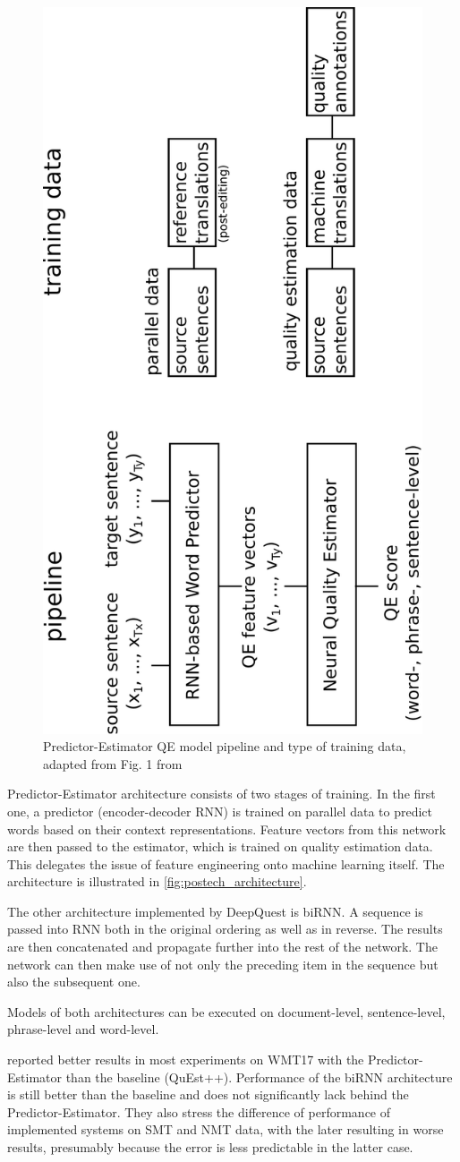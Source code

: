 \begin{figure}[H]
  \centering
  \includegraphics[height=0.9\textwidth, angle=-90]{img/quality_estimation/postech_architecture_pdfa1a.pdf}
  \caption{\label{fig:postech_architecture} Predictor-Estimator QE model pipeline and type of training data, adapted from Fig. 1 from \citep{Kim-Postech:2017}}
\end{figure}

Predictor-Estimator architecture \citep{Kim-Postech:2017} consists of two stages of training. In the first one, a predictor (encoder-decoder RNN) is trained on parallel data to predict words based on their context representations. Feature vectors from this network are then passed to the estimator, which is trained on quality estimation data. This delegates the issue of feature engineering onto machine learning itself. The architecture is illustrated in \autoref{fig:postech_architecture}.

The other architecture implemented by DeepQuest is biRNN. A sequence is passed into RNN both in the original ordering as well as in reverse. The results are then concatenated and propagate further into the rest of the network. The network can then make use of not only the preceding item in the sequence but also the subsequent one.

Models of both architectures can be executed on document-level, sentence-level, phrase-level and word-level.

\cite{deepquest} reported better results in most experiments on WMT17 with the Predictor-Estimator than the baseline (QuEst++). Performance of the biRNN architecture is still better than the baseline and does not significantly lack behind the Predictor-Estimator. They also stress the difference of performance of implemented systems on SMT and NMT data, with the later resulting in worse results, presumably because the error is less predictable in the latter case.

